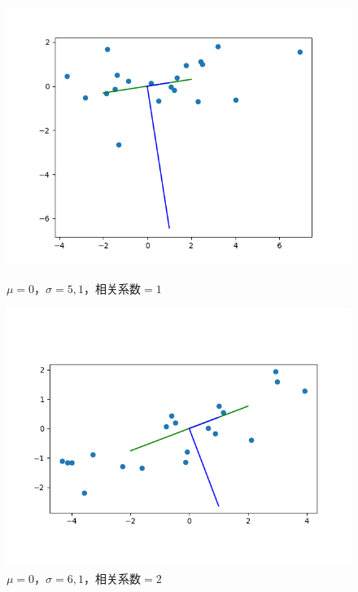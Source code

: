 \begin{figure}[htbp]
    \begin{minipage}[t]{0.3\linewidth}
        \centering
        \includegraphics[width=\textwidth]{figures/Figure_7.png}
        \caption{$\mu=0$，$\sigma=5,1$，相关系数$=1$}
        \label{7}
    \end{minipage}
    \begin{minipage}[t]{0.3\linewidth}
        \centering
        \includegraphics[width=\textwidth]{figures/Figure_8.png}
        \caption{$\mu=0$，$\sigma=6,1$，相关系数$=2$}
        \label{8}
    \end{minipage}
    \begin{minipage}[t]{0.3\linewidth}
        \centering

\end{minipage}
\end{figure}
